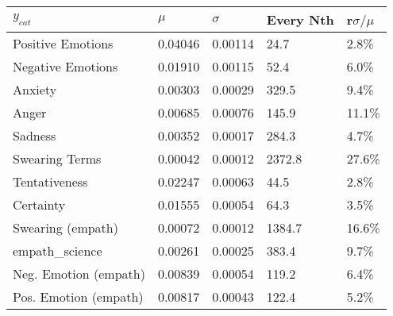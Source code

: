 \begin{tabular}{lllll}
\toprule
$y_{cat}$ &    $\mu$ & $\sigma$ & Every Nth & r$\sigma / \mu$ \\
\midrule
Positive Emotions     &  0.04046 &  0.00114 &      24.7 &           2.8\% \\
Negative Emotions     &  0.01910 &  0.00115 &      52.4 &           6.0\% \\
Anxiety               &  0.00303 &  0.00029 &     329.5 &           9.4\% \\
Anger                 &  0.00685 &  0.00076 &     145.9 &          11.1\% \\
Sadness               &  0.00352 &  0.00017 &     284.3 &           4.7\% \\
Swearing Terms        &  0.00042 &  0.00012 &    2372.8 &          27.6\% \\
Tentativeness         &  0.02247 &  0.00063 &      44.5 &           2.8\% \\
Certainty             &  0.01555 &  0.00054 &      64.3 &           3.5\% \\
Swearing (empath)     &  0.00072 &  0.00012 &    1384.7 &          16.6\% \\
empath_science        &  0.00261 &  0.00025 &     383.4 &           9.7\% \\
Neg. Emotion (empath) &  0.00839 &  0.00054 &     119.2 &           6.4\% \\
Pos. Emotion (empath) &  0.00817 &  0.00043 &     122.4 &           5.2\% \\
\bottomrule
\end{tabular}
